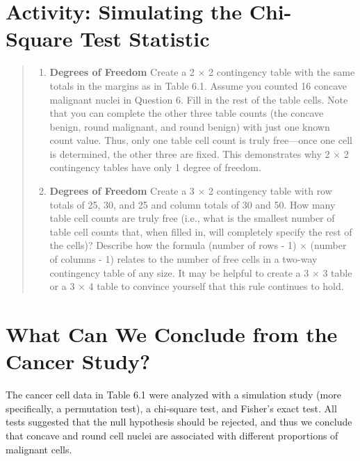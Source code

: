 \documentclass[
]{report}
\providecommand{\tightlist}{%
  \setlength{\itemsep}{0pt}\setlength{\parskip}{0pt}}
\begin{document}
\section*{Activity: Simulating the Chi-Square Test Statistic}\label{activity-simulating-the-chi-square-test-statistic}

\begin{quote}
\begin{enumerate}
\def\labelenumi{\arabic{enumi}.}
\setcounter{enumi}{19}
\tightlist
\item
  \textbf{Degrees of Freedom} Create a 2 × 2 contingency table with the same totals in the margins as in Table 6.1. Assume you counted 16 concave malignant nuclei in Question 6. Fill in the rest of the table cells. Note that you can complete the other three table counts (the concave benign, round malignant, and round benign) with just one known count value. Thus, only one table cell count is truly free---once one cell is determined, the other three are fixed. This demonstrates why 2 × 2 contingency tables have only 1 degree of freedom.\\
\item
  \textbf{Degrees of Freedom} Create a 3 × 2 contingency table with row totals of 25, 30, and 25 and column totals of 30 and 50. How many table cell counts are truly free (i.e., what is the smallest number of table cell counts that, when filled in, will completely specify the rest of the cells)? Describe how the formula (number of rows - 1) × (number of columns - 1) relates to the number of free cells in a two-way contingency table of any size. It may be helpful to create a 3 × 3 table or a 3 × 4 table to convince yourself that this rule continues to hold.
\end{enumerate}
\end{quote}

\section{\texorpdfstring{\textbf{What Can We Conclude from the Cancer Study?}}{What Can We Conclude from the Cancer Study?}}\label{what-can-we-conclude-from-the-cancer-study}

The cancer cell data in Table 6.1 were analyzed with a simulation study (more specifically, a permutation test), a chi-square test, and Fisher's exact test. All tests suggested that the null hypothesis should be rejected, and thus we conclude that concave and round cell nuclei are associated with different proportions of malignant cells.
\end{document}
